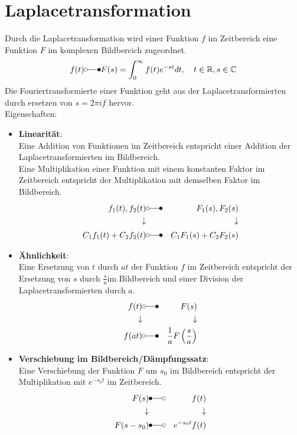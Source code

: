 \documentclass[12pt]{article}
\begin{document}
\section{Laplacetransformation}
Durch die Laplacetransformation wird einer Funktion $f$ im Zeitbereich eine Funktion $F$ im komplexen Bildbereich zugeordnet.
\begin{equation*}
	f(t)\laplace F(s)=\int_0^\infty f(t)e^{-st}dt, \quad t\in\mathbb{R}, s\in\mathbb{C}
\end{equation*}
Die Fouriertransformierte einer Funktion geht aus der Laplacetransformierten durch ersetzen von $s=2\pi if$ hervor.\\
Eigenschaften:
\begin{itemize}
	\item \textbf{Linearität}:\\
			Eine Addition von Funktionen im Zeitbereich entspricht einer Addition der Laplacetransformierten im Bildbereich.\\
			Eine Multiplikation einer Funktion mit einem konstanten Faktor im Zeitbereich entspricht der Multiplikation mit demselben Faktor im Bildbereich.
			\begin{eqnarray*}
				f_1(t),f_2(t) & \laplace & F_1(s),F_2(s)\\
				\downarrow & & \downarrow \\
				C_1f_1(t)+C_2f_2(t) & \laplace & C_1F_1(s)+C_2F_2(s)
			\end{eqnarray*}
	\item \textbf{Ähnlichkeit}:\\
			Eine Ersetzung von $t$ durch $at$ der Funktion $f$ im Zeitbereich entspricht der Ersetzung von $s$ durch $\frac{s}{a}$im Bildbereich und einer Division der Laplacetransformierten durch $a$.
			\begin{eqnarray*}
				f(t) & \laplace & F(s)\\
				\downarrow & & \downarrow \\
				f(at) & \laplace & \frac{1}{a} F\left(\frac{s}{a}\right)
			\end{eqnarray*}
	\item \textbf{Verschiebung im Bildbereich/Dämpfungssatz}:\\
			Eine Verschiebung der Funktion $F$ um $s_0$ im Bildbereich entspricht der Multiplikation mit $e^{-s_0 t}$ im Zeitbereich.
			\begin{eqnarray*}
				F(s) & \Laplace & f(t)\\
				\downarrow & & \downarrow \\
				F(s-s_0) & \Laplace & e^{-s_0t}f(t)
			\end{eqnarray*}
\end{itemize}
\end{document}

